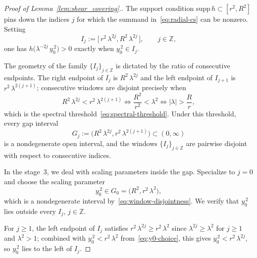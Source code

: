 \documentclass[pdflatex,sn-basic,Numbered]{sn-jnl}
\theoremstyle{thmstyleone}%
\theoremstyle{thmstylethree}%
\begin{document}
\begin{proof}[Proof of Lemma~\ref{lem:shear_covering}.]
	The support condition $\mathrm{supp}\, h \subset [r^{2}, R^{2}]$ pins down
	the indices $j$ for which the summand in~\eqref{eq:radial-cs} can be
	nonzero. Setting
	\begin{equation*}\label{eq:active-window}
		I_{j}  :=  \bigl[\, r^{2}\, \lambda^{2 j},  R^{2}\, \lambda^{2 j}\, \bigr],
		\qquad j \in \mathbb{Z},
	\end{equation*}
	one has
	$h\!\bigl( \lambda^{-2 j}\, y_{0}^{\,2} \bigr) > 0$ exactly when
	$y_{0}^{\,2} \in I_{j}$.
	
	The geometry of the family $\{I_{j}\}_{j \in \mathbb{Z}}$ is dictated by the
	ratio of consecutive endpoints. The right endpoint of $I_{j}$ is
	$R^{2}\, \lambda^{2 j}$ and the left endpoint of $I_{j+1}$ is
	$r^{2}\, \lambda^{2(j+1)}$; consecutive windows are disjoint precisely when
	\begin{equation}\label{eq:window-disjointness}
		R^{2}\, \lambda^{2 j}  <  r^{2}\, \lambda^{2 (j+1)}
		  \Longleftrightarrow  
		\frac{R^{2}}{r^{2}}  <  \lambda^{2}
		  \Longleftrightarrow  
		|\lambda|  >  \frac{R}{r},
	\end{equation}
	which is the spectral threshold~\eqref{eq:spectral-threshold}. Under this
	threshold, every gap interval
	\begin{equation*}\label{eq:gap-interval}
		G_{j}
		 := \bigl( R^{2}\, \lambda^{2 j}, 
		r^{2}\, \lambda^{2 (j+1)} \bigr)
		 \subset  (0, \infty)
	\end{equation*}
	is a nondegenerate open interval, and the windows $\{I_{j}\}_{j \in
		\mathbb{Z}}$ are pairwise disjoint with respect to consecutive indices.
	
In the stage~3, we deal with scaling parameters inside the gap. Specialize to $j = 0$ and choose the scaling parameter
	\begin{equation}\label{eq:y0-choice}
		y_{0}^{\,2}  \in  G_{0}
		 =  \bigl( R^{2},  r^{2}\, \lambda^{2} \bigr),
	\end{equation}
	which is a nondegenerate interval by~\eqref{eq:window-disjointness}. We
	verify that $y_{0}^{\,2}$ lies outside every $I_{j}$, $j \in \mathbb{Z}$.
	
	For $j \ge 1$, the left endpoint of $I_{j}$ satisfies
	$r^{2}\, \lambda^{2 j} \ge r^{2}\, \lambda^{2}$ since $\lambda^{2 j} \ge
	\lambda^{2}$ for $j \ge 1$ and $\lambda^{2} > 1$; combined with
	$y_{0}^{\,2} < r^{2}\, \lambda^{2}$ from~\eqref{eq:y0-choice}, this gives
	$y_{0}^{\,2} < r^{2}\, \lambda^{2 j}$, so $y_{0}^{\,2}$ lies to the
	left of $I_{j}$.
	

\end{proof}
\end{document}
